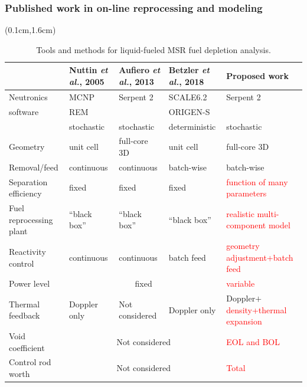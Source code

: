 

\begin{frame}
\frametitle{Published work in on-line reprocessing and modeling}

  \begin{textblock*}{12.5cm}(0.1cm,1.6cm) %
	\begin{table}[t]
	\fontsize{7}{9}\selectfont
	\caption{Tools and methods for liquid-fueled \gls{MSR} fuel depletion 
	analysis.}
			\vspace{-2mm}
	\begin{tabularx}{\textwidth}{p{2.5cm} X X X p{3cm}} 
		\hline 
		&Nuttin \emph{et al.}, 2005 \cite{nuttin_potential_2005}& Aufiero \emph{et al.}, 
		2013 \cite{aufiero_extended_2013} & Betzler \emph{et al.}, 2018 
		\cite{betzler_fuel_2018}&Proposed work \\ 
		\hline
		Neutronics & \gls{MCNP} & Serpent 2 & SCALE6.2 & Serpent 2 \\
		software   & REM &           & ORIGEN-S &  \\
	               & stochastic & stochastic & deterministic & stochastic\\ [3pt]
		Geometry  & unit cell & full-core 3D & unit cell & full-core 3D\\ [3pt]
		Removal/feed  & continuous &continuous & batch-wise & batch-wise\\ [3pt]
        Separation efficiency & fixed & fixed & fixed & \textcolor{red}{function of many parameters} \\[3pt]
        Fuel reprocessing plant & ``black box'' & ``black box'' & ``black box'' & \textcolor{red}{realistic multi-component model} \\[3pt]
        Reactivity control & continuous& continuous & batch feed & 
        \textcolor{red}{geometry adjustment\newline +batch feed}\\[3pt]
        Power level & \multicolumn{3}{c}{fixed}& \textcolor{red}{variable} 
        \\[3pt]
		Thermal feedback & Doppler only & Not considered & Doppler only & 
		Doppler$+$\textcolor{red}{density+thermal expansion}\\[3pt]
		Void coefficient  & \multicolumn{3}{c}{Not considered} & 
		\textcolor{red}{EOL and BOL} \\[3pt]
		Control rod worth & \multicolumn{3}{c}{Not considered} & 
		\textcolor{red}{Total} \\[3pt]
		\hline
	\end{tabularx}
	\label{tab:msr_codes}
\end{table}
\end{textblock*}

\end{frame}


